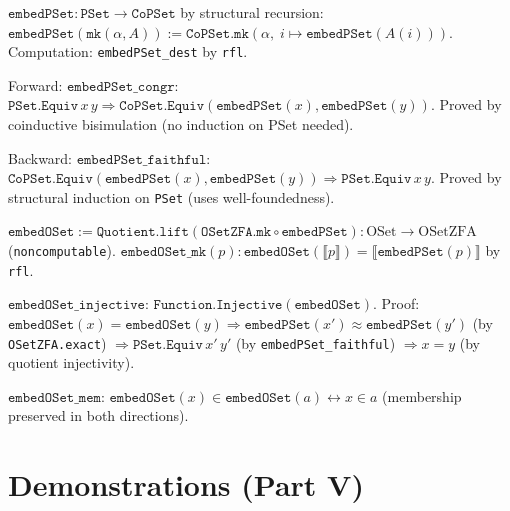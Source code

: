 \begin{definition}
\label{def:embedOSet}
\leanok
{}
$\texttt{embedPSet} : \texttt{PSet} \to \texttt{CoPSet}$ by structural
recursion: $\texttt{embedPSet}(\texttt{mk}(\alpha, A)) :=
\texttt{CoPSet.mk}(\alpha,\; i \mapsto \texttt{embedPSet}(A(i)))$.
Computation: \texttt{embedPSet\_dest} by \texttt{rfl}.

Forward: $\texttt{embedPSet\_congr}$: $\texttt{PSet.Equiv}\,x\,y \Rightarrow
\texttt{CoPSet.Equiv}(\texttt{embedPSet}(x), \texttt{embedPSet}(y))$.
Proved by coinductive bisimulation (no induction on PSet needed).

Backward: $\texttt{embedPSet\_faithful}$: $\texttt{CoPSet.Equiv}(\texttt{embedPSet}(x),
\texttt{embedPSet}(y)) \Rightarrow \texttt{PSet.Equiv}\,x\,y$.
Proved by structural induction on \texttt{PSet} (uses well-foundedness).

$\texttt{embedOSet} := \texttt{Quotient.lift}(\texttt{OSetZFA.mk} \circ
\texttt{embedPSet}) : \mathrm{OSet} \to \mathrm{OSetZFA}$ (\texttt{noncomputable}).
$\texttt{embedOSet\_mk}(p) : \texttt{embedOSet}(\llbracket p \rrbracket) =
\llbracket\texttt{embedPSet}(p)\rrbracket$ by \texttt{rfl}.
\end{definition}

\begin{theorem}
\label{thm:embedOSet_props}
\leanok
{}
$\texttt{embedOSet\_injective}$: $\texttt{Function.Injective}(\texttt{embedOSet})$.
Proof: $\texttt{embedOSet}(x) = \texttt{embedOSet}(y) \Rightarrow
\texttt{embedPSet}(x') \approx \texttt{embedPSet}(y')$ (by \texttt{OSetZFA.exact})
$\Rightarrow \texttt{PSet.Equiv}\,x'\,y'$ (by \texttt{embedPSet\_faithful})
$\Rightarrow x = y$ (by quotient injectivity).

$\texttt{embedOSet\_mem}$: $\texttt{embedOSet}(x) \in \texttt{embedOSet}(a)
\leftrightarrow x \in a$ (membership preserved in both directions).
\end{theorem}

\section{Demonstrations (Part V)}
\label{sec:setszfa_demos}

